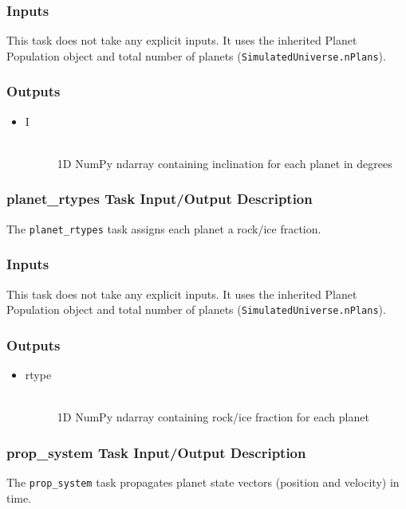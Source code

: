 \documentclass[cleanfoot]{asme2ej}
\begin{document}
\subsubsection*{Inputs}
This task does not take any explicit inputs.  It uses the inherited Planet Population object and total number of planets (\verb+SimulatedUniverse.nPlans+).

\subsubsection*{Outputs}
\begin{itemize}
    \item 
    \begin{description}
        \item[I] \hfill \\
        1D NumPy ndarray containing inclination for each planet in degrees 
    \end{description}
\end{itemize}

\subsubsection{planet\_rtypes Task Input/Output Description} \label{sec:planetrtypestask}
The \verb+planet_rtypes+ task assigns each planet a rock/ice fraction.

\subsubsection*{Inputs}
This task does not take any explicit inputs.  It uses the inherited Planet Population object and total number of planets (\verb+SimulatedUniverse.nPlans+).

\subsubsection*{Outputs}
\begin{itemize}
    \item 
    \begin{description}
        \item[rtype] \hfill \\
        1D NumPy ndarray containing rock/ice fraction for each planet 
    \end{description}
\end{itemize}

\subsubsection{prop\_system Task Input/Output Description} \label{sec:propsystemtask}
The \verb+prop_system+ task propagates planet state vectors (position and velocity) in time.
\end{document}
